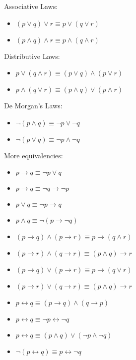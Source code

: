 \documentclass[../discrete.tex]{subfiles}
\begin{document}
Associative Laws:
\begin{itemize}
    \item $(p\lor q)\lor r\equiv p\lor(q\lor r)$
    \item $(p\land q)\land r\equiv p\land(q\land r)$
\end{itemize}

Distributive Laws:
\begin{itemize}
    \item $p\lor (q\land r)\equiv(p\lor q)\land (p\lor r)$
    \item $p\land (q\lor r)\equiv (p\land q)\lor (p\land r)$
\end{itemize}

De Morgan's Laws:
\begin{itemize}
    \item $\neg(p\land q)\equiv \neg p\lor \neg q$
    \item $\neg(p\lor q)\equiv \neg p\land \neg q$
\end{itemize}

More equivalencies:
\begin{itemize}
    \item $p\rightarrow q\equiv \neg p \lor q$
    \item $p\rightarrow q\equiv \neg q\rightarrow \neg p$
    \item $p\lor q\equiv \neg p\rightarrow q$
    \item $p\land q\equiv \neg(p\rightarrow \neg q)$
    \item $(p\rightarrow q)\land (p\rightarrow r)\equiv p\rightarrow (q\land r)$
    \item $(p\rightarrow r)\land (q\rightarrow r)\equiv (p\land q)\rightarrow r$
    \item $(p\rightarrow q)\lor (p\rightarrow r)\equiv p\rightarrow (q\lor r)$
    \item $(p\rightarrow r)\lor (q\rightarrow r)\equiv (p\land q)\rightarrow r$
    \item $p\leftrightarrow q\equiv (p\rightarrow q)\land (q\rightarrow p)$
    \item $p\leftrightarrow q\equiv \neg p\leftrightarrow \neg q$
    \item $p\leftrightarrow q\equiv (p\land q)\lor (\neg p\land \neg q)$
    \item $\neg(p\leftrightarrow q)\equiv p\leftrightarrow \neg q$
\end{itemize}
\end{document}
